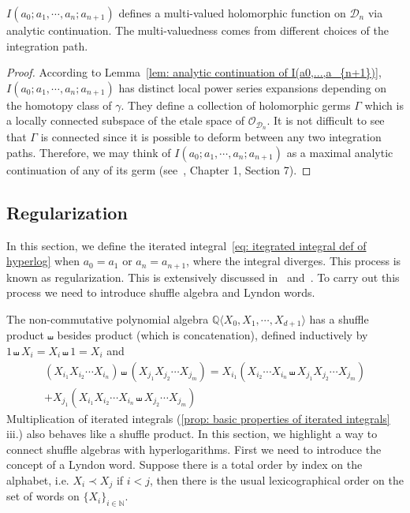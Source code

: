 \begin{proposition}\label{prop: realization of iterated integrals}
$I(a_0;a_1,\cdots,a_n;a_{n+1})$ defines a multi-valued holomorphic function on $\mathcal D_n$ via analytic continuation. The multi-valuedness comes from different choices of the integration path.
\end{proposition}

\begin{proof}
According to Lemma~\ref{lem: analytic continuation of I(a0,...,a_{n+1})}, $I(a_0;a_1,\cdots,a_n;a_{n+1})$  has distinct local power series expansions depending on the homotopy class of $\gamma$. They define a collection of holomorphic germs $\Gamma$ which is a locally connected subspace of the etale space of $\mathcal O_{\mathcal D_n}$. It is not difficult to see that $\Gamma$ is connected since it is possible to deform between any two integration paths. Therefore, we may think of $I(a_0;a_1,\cdots,a_n;a_{n+1})$ as a maximal analytic continuation of any of its germ (see~\cite{Otto_LecturesOnRiemannSurfaces}, Chapter 1, Section 7).
\end{proof}

\subsection{Regularization}

In this section, we define the iterated integral~\eqref{eq: itegrated integral def of hyperlog} when $a_0=a_1$ or $a_n=a_{n+1}$, where the integral diverges. This process is known as regularization. This is extensively discussed in~\cite{Goncharov_MultiplePolylogarithmsAndMixedTateMotives} and~\cite{FrancisBrown_SingleValuedHyperlogarithmsAndUnipotentDifferentialEquations}. To carry out this process we need to introduce shuffle algebra and Lyndon words.

The non-commutative polynomial algebra $\mathbb Q\langle X_0,X_1,\cdots,X_{d+1}\rangle$ has a shuffle product $\shuffle$ besides product (which is concatenation), defined inductively by $1\shuffle X_i=X_i\shuffle 1=X_i$ and
\begin{multline}
(X_{i_1}X_{i_2}\cdots X_{i_n})\shuffle(X_{j_1}X_{j_2}\cdots X_{j_m})=X_{i_1}(X_{i_2}\cdots X_{i_n}\shuffle X_{j_1}X_{j_2}\cdots X_{j_m})\\
+X_{j_1}(X_{i_1}X_{i_2}\cdots X_{i_n}\shuffle X_{j_2}\cdots X_{j_m})
\end{multline}
Multiplication of iterated integrals (\ref{prop: basic properties of iterated integrals} iii.) also behaves like a shuffle product. In this section, we highlight a way to connect shuffle algebras with hyperlogarithms. First we need to introduce the concept of a Lyndon word. Suppose there is a total order by index on the alphabet, i.e. $X_i\prec X_j$ if $i<j$, then there is the usual lexicographical order on the set of words on $\{X_i\}_{i\in\mathbb N}$.

